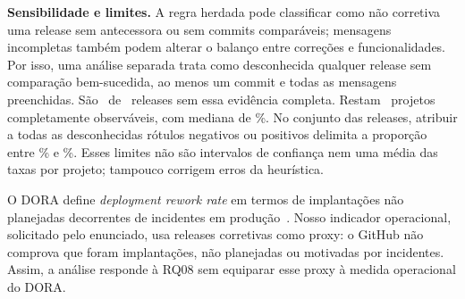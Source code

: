 \textbf{Sensibilidade e limites.} A regra herdada pode classificar como não corretiva
uma release sem antecessora ou sem commits comparáveis; mensagens incompletas também
podem alterar o balanço entre correções e funcionalidades. Por isso, uma análise
separada trata como desconhecida qualquer release sem comparação bem-sucedida, ao
menos um commit e todas as mensagens preenchidas. São \labCReworkSemEvidencia\ de
\labCReworkTotal\ releases sem essa evidência completa. Restam
\labCReworkConservadorN\ projetos completamente observáveis, com mediana de
\labCReworkConservadorMediana\%. No conjunto das releases, atribuir a todas as
desconhecidas rótulos negativos ou positivos delimita a proporção entre
\labCReworkLimInf\% e \labCReworkLimSup\%. Esses limites não são intervalos de
confiança nem uma média das taxas por projeto; tampouco corrigem erros da heurística.

O DORA define \textit{deployment rework rate} em termos de implantações não planejadas
decorrentes de incidentes em produção~\cite{doraMetricas}. Nosso indicador operacional,
solicitado pelo enunciado, usa releases corretivas como proxy: o GitHub não comprova
que foram implantações, não planejadas ou motivadas por incidentes. Assim, a análise
responde à RQ08 sem equiparar esse proxy à medida operacional do DORA.
